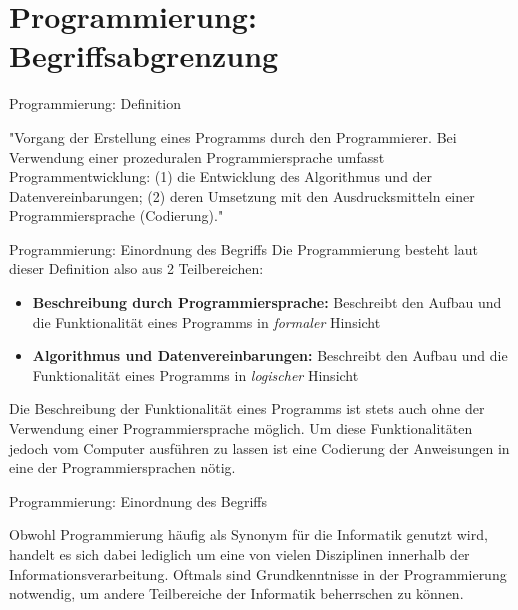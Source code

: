 \newcommand{\decktitle}{Grundlagen der Programmierung}

%
%


		
		
		
  
\section{Programmierung: Begriffsabgrenzung}  

  \begin{frame}{Programmierung: Definition}
        \label{def:programming}
        \begin{definition}
            "Vorgang der Erstellung eines Programms durch den Programmierer. Bei Verwendung einer prozeduralen Programmiersprache umfasst Programmentwicklung:\newline
    (1) die Entwicklung des Algorithmus und der Datenvereinbarungen;\newline
    (2) deren Umsetzung mit den Ausdrucksmitteln einer Programmiersprache (Codierung)." \cite{gabler:programmierung}
        \end{definition}
    \end{frame}
    
    \begin{frame}{Programmierung: Einordnung des Begriffs}
        Die Programmierung besteht laut dieser Definition also aus 2 Teilbereichen:
        
        \begin{itemize}
            \item \textbf{Beschreibung durch Programmiersprache:} Beschreibt den Aufbau und die Funktionalität eines Programms in \textit{formaler} Hinsicht
            \item \textbf{Algorithmus und Datenvereinbarungen:} Beschreibt den Aufbau und die Funktionalität eines Programms in \textit{logischer} Hinsicht
        \end{itemize}
        
        Die Beschreibung der Funktionalität eines Programms ist stets auch ohne der Verwendung einer Programmiersprache möglich. Um diese Funktionalitäten jedoch vom Computer ausführen zu lassen ist eine Codierung der Anweisungen in eine der Programmiersprachen nötig.
    \end{frame}
    
    
    \begin{frame}{Programmierung: Einordnung des Begriffs}
    
        Obwohl Programmierung häufig als Synonym für die Informatik genutzt wird, handelt es sich dabei lediglich um eine von vielen Disziplinen innerhalb der Informationsverarbeitung. Oftmals sind Grundkenntnisse in der Programmierung notwendig, um andere Teilbereiche der Informatik beherrschen zu können. 
    \end{frame}
    
